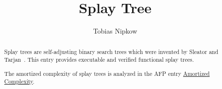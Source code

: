 \documentclass[11pt,a4paper]{article}
\begin{document}
\title{Splay Tree}
\author{Tobias Nipkow}
\maketitle

\begin{abstract}
Splay trees are self-adjusting binary search trees which were
invented by Sleator and Tarjan~\cite{SleatorT-JACM85}.
This entry provides executable and verified functional splay trees.

The amortized complexity of splay trees is analyzed in the AFP entry
\href{http://isa-afp.org/entries/Amortized_Complexity.shtml}{Amortized Complexity}.
\end{abstract}

\tableofcontents





\end{document}
